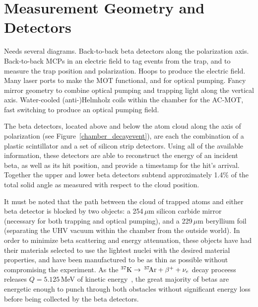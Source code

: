 \section{Measurement Geometry and Detectors}
	Needs several diagrams.  Back-to-back beta detectors along the polarization axis.  Back-to-back MCPs in an electric field to tag events from the trap, and to measure the trap position and polarization.  Hoops to produce the electric field.  Many laser ports to make the MOT functional, and for optical pumping.  Fancy mirror geometry to combine optical pumping and trapping light along the vertical axis.  Water-cooled (anti-)Helmholz coils within the chamber for the AC-MOT, fast switching to produce an optical pumping field.  

The beta detectors, located above and below the atom cloud along the axis of polarization (see Figure~\ref{chamber_decayevent}), are each the combination of a plastic scintillator and a set of silicon strip detectors.  Using all of the available information, these detectors are able to reconstruct the energy of an incident beta, as well as its hit position, and provide a timestamp for the hit's arrival.  Together the upper and lower beta detectors subtend approximately 1.4\% of the total solid angle as measured with respect to the cloud position. 

It must be noted that the path between the cloud of trapped atoms and either beta detector is blocked by two objects:  a 254$\,\mu$m silicon carbide mirror (necessary for both trapping and optical pumping), and a 229$\,\mu$m beryllium foil (separating the UHV vacuum within the chamber from the outside world).  In order to minimize beta scattering and energy attenuation, these objects have had their materials selected to use the lightest nuclei with the desired material properties, and have been manufactured to be as thin as possible without compromising the experiment.  As the $^{37}\textrm{K} \rightarrow \,^{37}\textrm{\!Ar} + \beta^{+} + \nu_e$ decay proceess releases $Q=5.125$\,MeV of kinetic energy~\cite{Q_value}, the great majority of betas are energetic enough to punch through both obstacles without significant energy loss before being collected by the beta detectors.  

